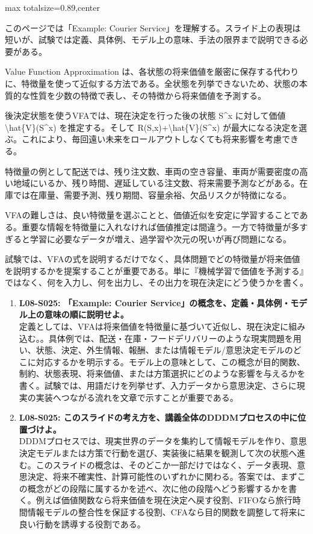 \begin{minipage}[t]{0.58\textwidth}
\begin{adjustbox}{max totalsize={\textwidth}{0.89\textheight},center}
\begin{minipage}{\textwidth}\scriptsize
{}このページでは「Example: Courier Service」を理解する。スライド上の表現は短いが、試験では定義、具体例、モデル上の意味、手法の限界まで説明できる必要がある。\par
Value Function Approximation は、各状態の将来価値を厳密に保存する代わりに、特徴量を使って近似する方法である。全状態を列挙できないため、状態の本質的な性質を少数の特徴で表し、その特徴から将来価値を予測する。\par
後決定状態を使うVFAでは、現在決定を行った後の状態 S\textasciicircum{}x に対して価値 \textbackslash{}hat\{V\}(S\textasciicircum{}x) を推定する。そして R(S,x)+\textbackslash{}hat\{V\}(S\textasciicircum{}x) が最大になる決定を選ぶ。これにより、毎回遠い未来をロールアウトしなくても将来影響を考慮できる。\par
特徴量の例として配送では、残り注文数、車両の空き容量、車両が需要密度の高い地域にいるか、残り時間、遅延している注文数、将来需要予測などがある。在庫では在庫量、需要予測、残り期間、容量余裕、欠品リスクが特徴になる。\par
VFAの難しさは、良い特徴量を選ぶことと、価値近似を安定に学習することである。重要な情報を特徴量に入れなければ価値推定は間違う。一方で特徴量が多すぎると学習に必要なデータが増え、過学習や次元の呪いが再び問題になる。\par
試験では、VFAの式を説明するだけでなく、具体問題でどの特徴量が将来価値を説明するかを提案することが重要である。単に『機械学習で価値を予測する』ではなく、何を入力し、何を出力し、その出力を現在決定にどう使うかを書く。\par{}\begin{enumerate}\item \textbf{L08-S025: 「Example: Courier Service」の概念を、定義・具体例・モデル上の意味の順に説明せよ。}\\定義としては、VFAは将来価値を特徴量に基づいて近似し、現在決定に組み込む。。具体例では、配送・在庫・フードデリバリーのような現実問題を用い、状態、決定、外生情報、報酬、または情報モデル/意思決定モデルのどこに対応するかを明示する。モデル上の意味として、この概念が目的関数、制約、状態表現、将来価値、または方策選択にどのような影響を与えるかを書く。試験では、用語だけを列挙せず、入力データから意思決定、さらに現実の実装へつながる流れを文章で示すことが重要である。\item \textbf{L08-S025: このスライドの考え方を、講義全体のDDDMプロセスの中に位置づけよ。}\\DDDMプロセスでは、現実世界のデータを集約して情報モデルを作り、意思決定モデルまたは方策で行動を選び、実装後に結果を観測して次の状態へ進む。このスライドの概念は、そのどこか一部だけではなく、データ表現、意思決定、将来不確実性、計算可能性のいずれかに関わる。答案では、まずこの概念がどの段階に属するかを述べ、次に他の段階へどう影響するかを書く。例えば価値関数なら将来価値を現在決定へ戻す役割、FIFOなら旅行時間情報モデルの整合性を保証する役割、CFAなら目的関数を調整して将来に良い行動を誘導する役割である。\end{enumerate}

\end{minipage}
\end{adjustbox}
\end{minipage}
